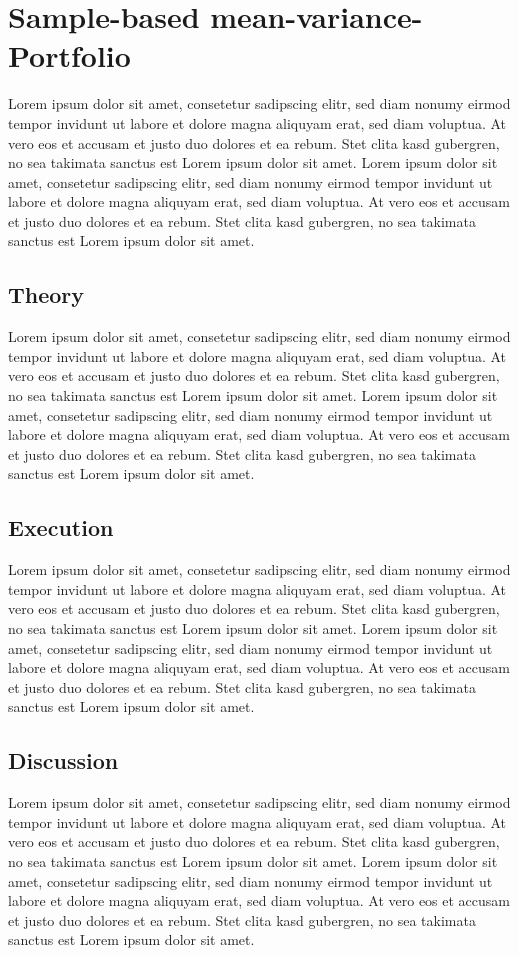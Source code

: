 \section{Sample-based mean-variance-Portfolio}
Lorem ipsum dolor sit amet, consetetur sadipscing elitr, sed diam nonumy eirmod tempor invidunt ut labore et dolore magna aliquyam erat, sed diam voluptua. At vero eos et accusam et justo duo dolores et ea rebum. Stet clita kasd gubergren, no sea takimata sanctus est Lorem ipsum dolor sit amet. Lorem ipsum dolor sit amet, consetetur sadipscing elitr, sed diam nonumy eirmod tempor invidunt ut labore et dolore magna aliquyam erat, sed diam voluptua. At vero eos et accusam et justo duo dolores et ea rebum. Stet clita kasd gubergren, no sea takimata sanctus est Lorem ipsum dolor sit amet.
\subsection{Theory}
Lorem ipsum dolor sit amet, consetetur sadipscing elitr, sed diam nonumy eirmod tempor invidunt ut labore et dolore magna aliquyam erat, sed diam voluptua. At vero eos et accusam et justo duo dolores et ea rebum. Stet clita kasd gubergren, no sea takimata sanctus est Lorem ipsum dolor sit amet. Lorem ipsum dolor sit amet, consetetur sadipscing elitr, sed diam nonumy eirmod tempor invidunt ut labore et dolore magna aliquyam erat, sed diam voluptua. At vero eos et accusam et justo duo dolores et ea rebum. Stet clita kasd gubergren, no sea takimata sanctus est Lorem ipsum dolor sit amet.
\subsection{Execution}
Lorem ipsum dolor sit amet, consetetur sadipscing elitr, sed diam nonumy eirmod tempor invidunt ut labore et dolore magna aliquyam erat, sed diam voluptua. At vero eos et accusam et justo duo dolores et ea rebum. Stet clita kasd gubergren, no sea takimata sanctus est Lorem ipsum dolor sit amet. Lorem ipsum dolor sit amet, consetetur sadipscing elitr, sed diam nonumy eirmod tempor invidunt ut labore et dolore magna aliquyam erat, sed diam voluptua. At vero eos et accusam et justo duo dolores et ea rebum. Stet clita kasd gubergren, no sea takimata sanctus est Lorem ipsum dolor sit amet.
\subsection{Discussion}
Lorem ipsum dolor sit amet, consetetur sadipscing elitr, sed diam nonumy eirmod tempor invidunt ut labore et dolore magna aliquyam erat, sed diam voluptua. At vero eos et accusam et justo duo dolores et ea rebum. Stet clita kasd gubergren, no sea takimata sanctus est Lorem ipsum dolor sit amet. Lorem ipsum dolor sit amet, consetetur sadipscing elitr, sed diam nonumy eirmod tempor invidunt ut labore et dolore magna aliquyam erat, sed diam voluptua. At vero eos et accusam et justo duo dolores et ea rebum. Stet clita kasd gubergren, no sea takimata sanctus est Lorem ipsum dolor sit amet.

